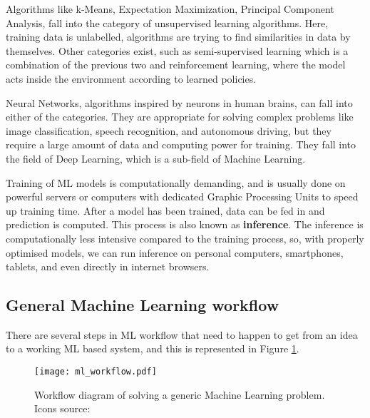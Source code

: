 Algorithms like k-Means, Expectation Maximization, Principal Component Analysis, fall into the category of unsupervised learning algorithms.
Here, training data is unlabelled, algorithms are trying to find similarities in data by themselves\cite{geron}.
Other categories exist, such as semi-supervised learning which is a combination of the previous two and reinforcement learning, where the model acts inside the environment according to learned policies\cite{geron}.

Neural Networks, algorithms inspired by neurons in human brains\cite{geron}\cite{cs231n}, can fall into either of the categories. 
They are appropriate for solving complex problems like image classification, speech recognition, and autonomous driving, but they require a large amount of data and computing power for training.
They fall into the field of Deep Learning, which is a sub-field of Machine Learning.

Training of ML models is computationally demanding, and is usually done on powerful servers or computers with dedicated Graphic Processing Units to speed up training time.
After a model has been trained, data can be fed in and prediction is computed. 
This process is also known as \textbf{inference}.
The inference is computationally less intensive compared to the training process, so, with properly optimised models, we can run inference on personal computers, smartphones, tablets, and even directly in internet browsers.


\subsection{ General Machine Learning workflow}

There are several steps in ML workflow that need to happen to get from an idea to a working ML based system, and this is represented in Figure \ref{ml_workflow}.

\begin{figure}[ht]
        \centering
        \texttt{[image: ml\_workflow.pdf]} 
        \caption[Workflow diagram of solving a generic Machine Learning problem.] {Workflow diagram of solving a generic Machine Learning problem. Icons source:\cite{icons}}
        \label{ml_workflow}
\end{figure}

